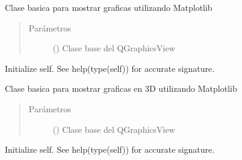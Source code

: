 \documentclass[letterpaper,10pt,spanish]{sphinxmanual}
\begin{document}
\begin{fulllineitems}
\label{\detokenize{codigos/Promociones:mlpwidget.MlpWidget}}
Clase basica para mostrar graficas utilizando Matplotlib
\begin{quote}\begin{description}
\item[{Parámetros}] \leavevmode
{} () \textendash{} Clase base del QGraphicsView

\end{description}\end{quote}

\begin{fulllineitems}
\label{\detokenize{codigos/Promociones:mlpwidget.MlpWidget.__init__}}
Initialize self.  See help(type(self)) for accurate signature.

\end{fulllineitems}


\end{fulllineitems}


\begin{fulllineitems}
\label{\detokenize{codigos/Promociones:mlpwidget.MlpWidget3D}}
Clase basica para mostrar graficas en 3D utilizando Matplotlib
\begin{quote}\begin{description}
\item[{Parámetros}] \leavevmode
{} () \textendash{} Clase base del QGraphicsView

\end{description}\end{quote}

\begin{fulllineitems}
\label{\detokenize{codigos/Promociones:mlpwidget.MlpWidget3D.__init__}}
Initialize self.  See help(type(self)) for accurate signature.

\end{fulllineitems}


\end{fulllineitems}
\end{document}
